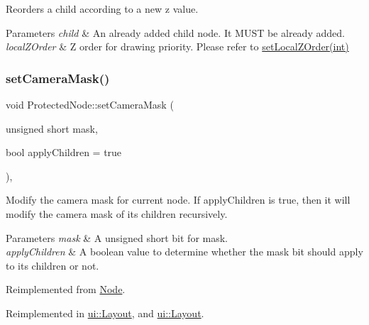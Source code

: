 Reorders a child according to a new z value.


\begin{DoxyParams}{Parameters}
{\em child} & An already added child node. It M\+U\+ST be already added. \\
\hline
{\em local\+Z\+Order} & Z order for drawing priority. Please refer to \hyperlink{classNode_aee4e616c2d55b722226aae1e68b4946f}{set\+Local\+Z\+Order(int)} \\
\hline
\end{DoxyParams}
\mbox{\label{classProtectedNode_a45ddaa88c746ea6707b8a09bb50b457d}} 
\subsubsection{\texorpdfstring{set\+Camera\+Mask()}{setCameraMask()}\hspace{0.1cm}{\footnotesize\ttfamily [1/2]}}
{\footnotesize\ttfamily void Protected\+Node\+::set\+Camera\+Mask (\begin{DoxyParamCaption}\item[{unsigned short}]{mask,  }\item[{bool}]{apply\+Children = {\ttfamily true} }\end{DoxyParamCaption})\hspace{0.3cm}{\ttfamily [override]}, {\ttfamily [virtual]}}

Modify the camera mask for current node. If apply\+Children is true, then it will modify the camera mask of its children recursively. 
\begin{DoxyParams}{Parameters}
{\em mask} & A unsigned short bit for mask. \\
\hline
{\em apply\+Children} & A boolean value to determine whether the mask bit should apply to its children or not. \\
\hline
\end{DoxyParams}


Reimplemented from \hyperlink{classNode_a0403546687b2cb6fc211fb461e33ba4d}{Node}.



Reimplemented in \hyperlink{classui_1_1Layout_a7468a69a70aa481c7a429db365f0362c}{ui\+::\+Layout}, and \hyperlink{classui_1_1Layout_a38e44717b8af16b5b5c1f299081ae854}{ui\+::\+Layout}.

\mbox{\label{classProtectedNode_ad259bd1bedc5f273b3850c74dc58c2f2}} 
